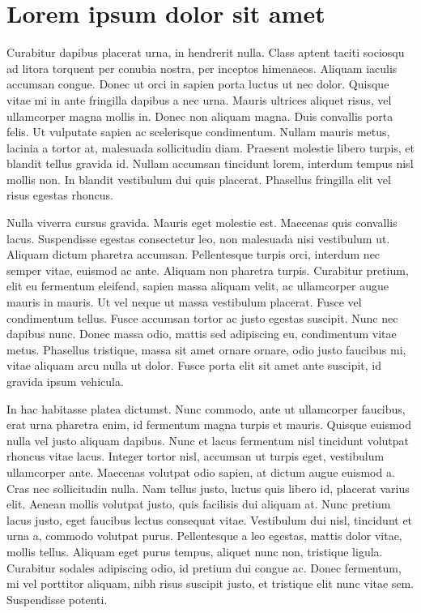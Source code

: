 \section{Lorem ipsum dolor sit amet}\label{sec:LABEL_CHP_1_SEC_I}
Curabitur dapibus placerat urna, in hendrerit nulla. Class aptent taciti sociosqu ad litora torquent per conubia nostra, per inceptos himenaeos. Aliquam iaculis accumsan congue. Donec ut orci in sapien porta luctus ut nec dolor. Quisque vitae mi in ante fringilla dapibus a nec urna. Mauris ultrices aliquet risus, vel ullamcorper magna mollis in. Donec non aliquam magna. Duis convallis porta felis. Ut vulputate sapien ac scelerisque condimentum. Nullam mauris metus, lacinia a tortor at, malesuada sollicitudin diam. Praesent molestie libero turpis, et blandit tellus gravida id. Nullam accumsan tincidunt lorem, interdum tempus nisl mollis non. In blandit vestibulum dui quis placerat. Phasellus fringilla elit vel risus egestas rhoncus.

Nulla viverra cursus gravida. Mauris eget molestie est. Maecenas quis convallis lacus. Suspendisse egestas consectetur leo, non malesuada nisi vestibulum ut. Aliquam dictum pharetra accumsan. Pellentesque turpis orci, interdum nec semper vitae, euismod ac ante. Aliquam non pharetra turpis. Curabitur pretium, elit eu fermentum eleifend, sapien massa aliquam velit, ac ullamcorper augue mauris in mauris. Ut vel neque ut massa vestibulum placerat. Fusce vel condimentum tellus. Fusce accumsan tortor ac justo egestas suscipit. Nunc nec dapibus nunc. Donec massa odio, mattis sed adipiscing eu, condimentum vitae metus. Phasellus tristique, massa sit amet ornare ornare, odio justo faucibus mi, vitae aliquam arcu nulla ut dolor. Fusce porta elit sit amet ante suscipit, id gravida ipsum vehicula.

In hac habitasse platea dictumst. Nunc commodo, ante ut ullamcorper faucibus, erat urna pharetra enim, id fermentum magna turpis et mauris. Quisque euismod nulla vel justo aliquam dapibus. Nunc et lacus fermentum nisl tincidunt volutpat rhoncus vitae lacus. Integer tortor nisl, accumsan ut turpis eget, vestibulum ullamcorper ante. Maecenas volutpat odio sapien, at dictum augue euismod a. Cras nec sollicitudin nulla. Nam tellus justo, luctus quis libero id, placerat varius elit. Aenean mollis volutpat justo, quis facilisis dui aliquam at. Nunc pretium lacus justo, eget faucibus lectus consequat vitae. Vestibulum dui nisl, tincidunt et urna a, commodo volutpat purus. Pellentesque a leo egestas, mattis dolor vitae, mollis tellus. Aliquam eget purus tempus, aliquet nunc non, tristique ligula. Curabitur sodales adipiscing odio, id pretium dui congue ac. Donec fermentum, mi vel porttitor aliquam, nibh risus suscipit justo, et tristique elit nunc vitae sem. Suspendisse potenti.

